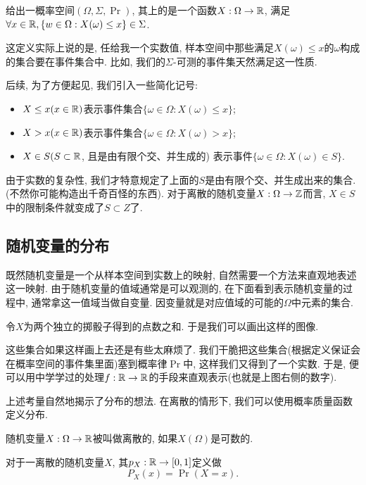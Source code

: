 \documentclass{ctexart}
\begin{document}
\begin{definition}[随机变量]
    给出一概率空间$(\Omega, \Sigma, \Pr)$, 其上的是一个函数$X:\Omega \to \mathbb R$, 满足$\forall x \in \mathbb R, \{ w \in \Omega: X(\omega) \leq  x \} \in \Sigma$. 
\end{definition}

这定义实际上说的是, 任给我一个实数值, 样本空间中那些满足$X(\omega)\leq x$的$\omega$构成的集合要在事件集合中. 比如, 我们的$\Sigma$-可测的事件集天然满足这一性质. 

后续, 为了方便起见, 我们引入一些简化记号: 

\begin{itemize}
    \item $X\leq x(x \in \mathbb R)$表示事件集合$\{ \omega \in \Omega:X(\omega)\leq x \}$;
    \item $X > x(x \in \mathbb R)$表示事件集合$\{ \omega \in \Omega:X(\omega)> x \}$;
    \item $X \in S(S \subset \mathbb R$, 且是由有限个交、并生成的) 表示事件$\{ \omega \in \Omega: X(\omega) \in S \}$. 
\end{itemize}


由于实数的复杂性, 我们才特意规定了上面的$S$是由有限个交、并生成出来的集合. (不然你可能构造出千奇百怪的东西). 对于离散的随机变量$X:\Omega \to {\mathbb Z}$而言, $X \in S$中的限制条件就变成了$S \subset Z$了. 

\subsection{随机变量的分布}

既然随机变量是一个从样本空间到实数上的映射, 自然需要一个方法来直观地表述这一映射. 由于随机变量的值域通常是可以观测的, 在下面看到表示随机变量的过程中, 通常拿这一值域当做自变量. 因变量就是对应值域的可能的$\Omega$中元素的集合. 

令$X$为两个独立的掷骰子得到的点数之和. 于是我们可以画出这样的图像. 


这些集合如果这样画上去还是有些太麻烦了. 我们干脆把这些集合(根据定义保证会在概率空间的事件集里面)塞到概率律$\Pr$中, 这样我们又得到了一个实数. 于是, 便可以用中学学过的处理$f:\mathbb R \to \mathbb R$的手段来直观表示(也就是上图右侧的数字).  

上述考量自然地揭示了分布的想法. 在离散的情形下, 我们可以使用概率质量函数定义分布. 

\begin{definition}[概率质量函数]
    随机变量$X:\Omega \to \mathbb R$被叫做离散的, 如果$X(\Omega)$是可数的. 

    对于一离散的随机变量$X$, 其$p_X:\mathbb R\to[0,1]$定义做
    \[
        P_X(x)=\Pr(X=x).
    \]
\end{definition}
\end{document}
